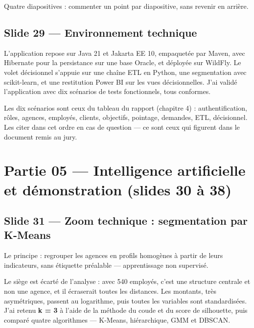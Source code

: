 \documentclass[a4paper,11pt]{article}
\begin{document}
\begin{note}
\small Quatre diapositives : commenter un point par diapositive, sans revenir
en arrière.
\end{note}

\subsection*{Slide 29 --- Environnement technique}

L'application repose sur Java 21 et Jakarta EE 10, empaquetée par Maven,
avec Hibernate pour la persistance sur une base Oracle, et déployée sur WildFly.
Le volet décisionnel s'appuie sur une chaîne ETL en Python, une segmentation
avec scikit-learn, et une restitution Power BI sur les vues décisionnelles.
J'ai validé l'application avec dix scénarios de tests fonctionnels, tous
conformes.

\begin{note}
\small Les dix scénarios sont ceux du tableau du rapport (chapitre 4) :
authentification, rôles, agences, employés, clients, objectifs, pointage,
demandes, ETL, décisionnel. Les citer dans cet ordre en cas de question ---
ce sont ceux qui figurent dans le document remis au jury.
\end{note}

\section*{Partie 05 --- Intelligence artificielle et démonstration (slides 30 à 38)}


\subsection*{Slide 31 --- Zoom technique : segmentation par K-Means}

Le principe : regrouper les agences en profils homogènes à partir de leurs
indicateurs, sans étiquette préalable --- apprentissage non supervisé.

Le siège est écarté de l'analyse : avec 540 employés, c'est une structure
centrale et non une agence, et il écraserait toutes les distances. Les montants,
très asymétriques, passent au logarithme, puis toutes les variables sont
standardisées. J'ai retenu \textbf{k = 3} à l'aide de la méthode du coude et du
score de silhouette, puis comparé quatre algorithmes --- K-Means, hiérarchique,
GMM et DBSCAN.
\end{document}

